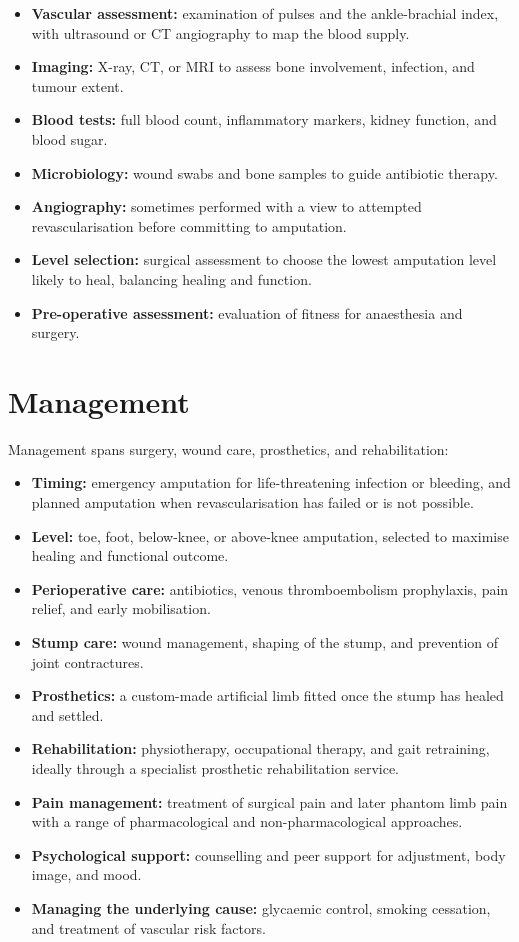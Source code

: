 \begin{itemize}
    \item \textbf{Vascular assessment:} examination of pulses and the ankle-brachial index, with ultrasound or CT angiography to map the blood supply.
    \item \textbf{Imaging:} X-ray, CT, or MRI to assess bone involvement, infection, and tumour extent.
    \item \textbf{Blood tests:} full blood count, inflammatory markers, kidney function, and blood sugar.
    \item \textbf{Microbiology:} wound swabs and bone samples to guide antibiotic therapy.
    \item \textbf{Angiography:} sometimes performed with a view to attempted revascularisation before committing to amputation.
    \item \textbf{Level selection:} surgical assessment to choose the lowest amputation level likely to heal, balancing healing and function.
    \item \textbf{Pre-operative assessment:} evaluation of fitness for anaesthesia and surgery.
\end{itemize}

\section*{Management}
Management spans surgery, wound care, prosthetics, and rehabilitation:

\begin{itemize}
    \item \textbf{Timing:} emergency amputation for life-threatening infection or bleeding, and planned amputation when revascularisation has failed or is not possible.
    \item \textbf{Level:} toe, foot, below-knee, or above-knee amputation, selected to maximise healing and functional outcome.
    \item \textbf{Perioperative care:} antibiotics, venous thromboembolism prophylaxis, pain relief, and early mobilisation.
    \item \textbf{Stump care:} wound management, shaping of the stump, and prevention of joint contractures.
    \item \textbf{Prosthetics:} a custom-made artificial limb fitted once the stump has healed and settled.
    \item \textbf{Rehabilitation:} physiotherapy, occupational therapy, and gait retraining, ideally through a specialist prosthetic rehabilitation service.
    \item \textbf{Pain management:} treatment of surgical pain and later phantom limb pain with a range of pharmacological and non-pharmacological approaches.
    \item \textbf{Psychological support:} counselling and peer support for adjustment, body image, and mood.
    \item \textbf{Managing the underlying cause:} glycaemic control, smoking cessation, and treatment of vascular risk factors.
\end{itemize}

